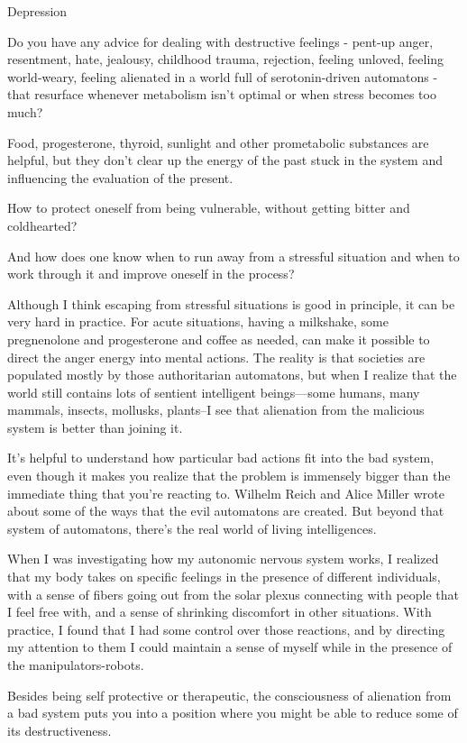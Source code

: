 \documentclass[11pt,oneside,openany,extrafontsizes]{memoir}
\begin{document}
\begin{qaexchange}{Depression}

    \begin{question}
        Do you have any advice for dealing with destructive feelings - pent-up anger, resentment, hate, jealousy, childhood trauma, rejection, feeling unloved, feeling world-weary, feeling alienated in a world full of serotonin-driven automatons - that resurface whenever metabolism isn't optimal or when stress becomes too much?

        Food, progesterone, thyroid, sunlight and other prometabolic substances are helpful, but they don't clear up the energy of the past stuck in the system and influencing the evaluation of the present.

        How to protect oneself from being vulnerable, without getting bitter and coldhearted?

        And how does one know when to run away from a stressful situation and when to work through it and improve oneself in the process?
    \end{question}

    \begin{answer}
      Although I think escaping from stressful situations is good in principle, it can be very hard in practice. For acute situations, having a milkshake, some pregnenolone and progesterone and coffee as needed, can make it possible to direct the anger energy into mental actions. The reality is that societies are populated mostly by those authoritarian automatons, but when I realize that the world still contains lots of sentient intelligent beings—some humans, many mammals, insects, mollusks, plants--I see that alienation from the malicious system is better than joining it.

      It's helpful to understand how particular bad actions fit into the bad system, even though it makes you realize that the problem is immensely bigger than the immediate thing that you're reacting to. Wilhelm Reich and Alice Miller wrote about some of the ways that the evil automatons are created. But beyond that system of automatons, there's the real world of living intelligences.

      When I was investigating how my autonomic nervous system works, I realized that my body takes on specific feelings in the presence of different individuals, with a sense of fibers going out from the solar plexus connecting with people that I feel free with, and a sense of shrinking discomfort in other situations. With practice, I found that I had some control over those reactions, and by directing my attention to them I could maintain a sense of myself while in the presence of the manipulators-robots.

      Besides being self protective or therapeutic, the consciousness of alienation from a bad system puts you into a position where you might be able to reduce some of its destructiveness.
    \end{answer}
\end{qaexchange}
\end{document}
